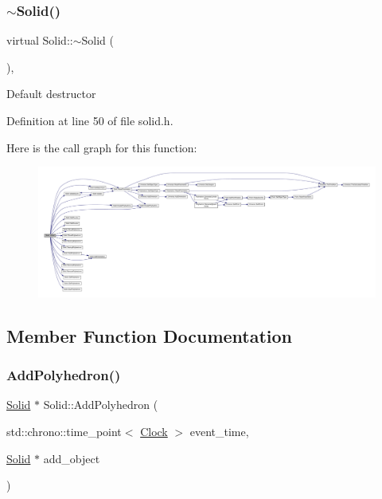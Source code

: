 \subsubsection{\texorpdfstring{$\sim$\+Solid()}{~Solid()}}
{\footnotesize\ttfamily virtual Solid\+::$\sim$\+Solid (\begin{DoxyParamCaption}{ }\end{DoxyParamCaption})\hspace{0.3cm}{\ttfamily [inline]}, {\ttfamily [virtual]}}

Default destructor 

Definition at line 50 of file solid.\+h.

Here is the call graph for this function\+:
\nopagebreak
\begin{figure}[H]
\begin{center}
\leavevmode
\includegraphics[width=350pt]{class_solid_a07095e0808c0ef6b206bc70992ef557d_cgraph}
\end{center}
\end{figure}


\subsection{Member Function Documentation}
\mbox{\label{class_solid_a87a3b588f931ff20f09a5d46f6cb7907}} 
\subsubsection{\texorpdfstring{Add\+Polyhedron()}{AddPolyhedron()}}
{\footnotesize\ttfamily \hyperlink{class_solid}{Solid} $\ast$ Solid\+::\+Add\+Polyhedron (\begin{DoxyParamCaption}\item[{std\+::chrono\+::time\+\_\+point$<$ \hyperlink{universe_8h_a0ef8d951d1ca5ab3cfaf7ab4c7a6fd80}{Clock} $>$}]{event\+\_\+time,  }\item[{\hyperlink{class_solid}{Solid} $\ast$}]{add\+\_\+object }\end{DoxyParamCaption})}



